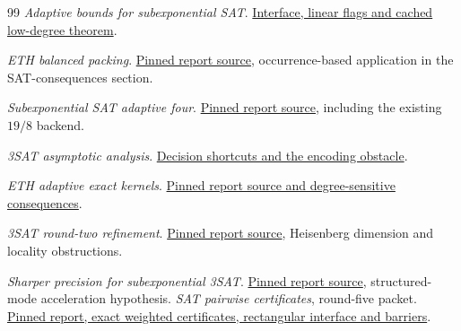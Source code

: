 \begin{thebibliography}{99}
\emph{Adaptive bounds for subexponential SAT}.
\href{https://github.com/VladimirReshetnikov/ProveIt/tree/7de9d09fecd17de776d712835ecb2011205c531d/Computability/SubexponentialSAT/Research/sat_adaptive_bounds/report}{Interface, linear flags and cached low-degree theorem}.

\emph{ETH balanced packing}.
\href{https://github.com/VladimirReshetnikov/ProveIt/blob/7de9d09fecd17de776d712835ecb2011205c531d/Computability/SubexponentialSAT/Research/eth_balanced_packing/report.tex}{Pinned report source}, occurrence-based application in the SAT-consequences section.

\emph{Subexponential SAT adaptive four}.
\href{https://github.com/VladimirReshetnikov/ProveIt/blob/7de9d09fecd17de776d712835ecb2011205c531d/Computability/SubexponentialSAT/Research/subexponential_sat_adaptive_four/report.tex}{Pinned report source}, including the existing $19/8$ backend.

\emph{3SAT asymptotic analysis}.
\href{https://github.com/VladimirReshetnikov/ProveIt/blob/7de9d09fecd17de776d712835ecb2011205c531d/Computability/SubexponentialSAT/Research/3sat_asymptotic_analysis/report/research_routes.tex}{Decision shortcuts and the encoding obstacle}.

\emph{ETH adaptive exact kernels}.
\href{https://github.com/VladimirReshetnikov/ProveIt/blob/7de9d09fecd17de776d712835ecb2011205c531d/Computability/SubexponentialSAT/Research/eth_adaptive_exact_kernels/report.tex}{Pinned report source and degree-sensitive consequences}.

\emph{3SAT round-two refinement}.
\href{https://github.com/VladimirReshetnikov/ProveIt/blob/7de9d09fecd17de776d712835ecb2011205c531d/Computability/SubexponentialSAT/Research/3sat_round2_refinement/report/report.tex}{Pinned report source}, Heisenberg dimension and locality obstructions.

\emph{Sharper precision for subexponential 3SAT}.
\href{https://github.com/VladimirReshetnikov/ProveIt/blob/7de9d09fecd17de776d712835ecb2011205c531d/Computability/SubexponentialSAT/Research/3sat_precision_refinement/report.tex}{Pinned report source}, structured-mode acceleration hypothesis.
\emph{SAT pairwise certificates}, round-five packet.
\href{https://github.com/VladimirReshetnikov/ProveIt/tree/324f3d9b009ab0323f33be65cd6577867c9c4338/Computability/SubexponentialSAT/Research/sat_pairwise_certificates}{Pinned report, exact weighted certificates, rectangular interface and barriers}.


\end{thebibliography}

